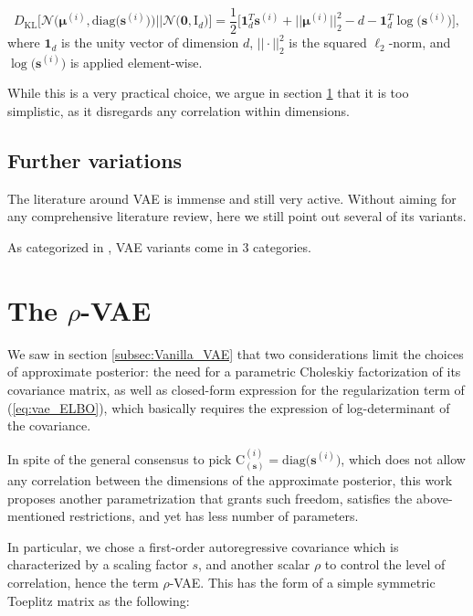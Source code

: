 \documentclass{article}
\begin{document}
\begin{equation}  \label{eq:vae_KLD_loss}
D_{\text{KL}}\Big[ \mathcal{N} \Big( \boldsymbol{\mu}^{(i)}, \text{diag} \big( \mathbf{s}^{(i)} \big) \Big)    \Big|\Big|  \mathcal{N} \big( \mathbf{0}, \mathrm{I}_d \big)  \Big] = \frac{1}{2} \Big[ \mathbf{1}_d^T \mathbf{s}^{(i)} + \big|\big| \boldsymbol{\mu}^{(i)} \big|\big|_2^2 -d -  \mathbf{1}_d^T \log \big({\mathbf{s}^{(i)}} \big) \Big], 
\end{equation}
where $\mathbf{1}_d$ is the unity vector of dimension $d$, $||\cdot||_2^2$ is the squared $\ell_2$-norm, and $\log \big({\mathbf{s}^{(i)}} \big)$ is applied element-wise.

While this is a very practical choice, we argue in section \ref{sec:proposed} that it is too simplistic, as it disregards any correlation within dimensions.


\subsection{Further variations} \label{subsec:SOTA}
The literature around VAE is immense and still very active. Without aiming for any comprehensive literature review, here we still point out several of its variants.

As categorized in \cite{tschannen2018recent}, VAE variants come in 3 categories.
 
\section{The $\rho$-VAE}  \label{sec:proposed}
We saw in section \ref{subsec:Vanilla_VAE} that two considerations limit the choices of approximate posterior: the need for a parametric Choleskiy factorization of its covariance matrix, as well as closed-form expression for the regularization term of (\ref{eq:vae_ELBO}), which basically requires the expression of log-determinant  of the covariance.

In spite of the general consensus to pick $\mathrm{C}_{(\mathbf{s})}^{(i)} = \text{diag}\big( \mathbf{s}^{(i)} \big)$, which does not allow any correlation between the dimensions of the approximate posterior, this work proposes another parametrization that grants such freedom, satisfies the above-mentioned restrictions, and yet has less number of parameters.

In particular, we chose a first-order autoregressive covariance which is characterized by a scaling factor $s$, and another scalar $\rho$ to control the level of correlation, hence the term $\rho$-VAE. This has the form of a simple symmetric Toeplitz matrix as the following:
\end{document}
